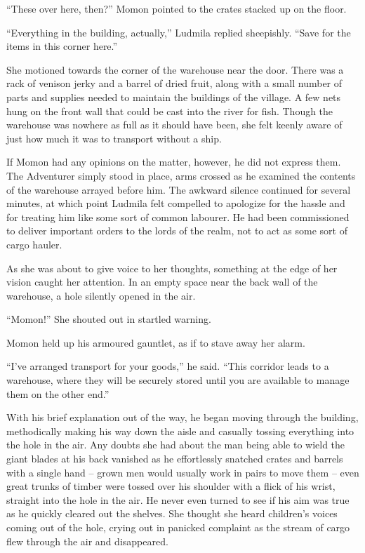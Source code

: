  

“These over here, then?” Momon pointed to the crates stacked up on the floor.

 

“Everything in the building, actually,” Ludmila replied sheepishly. “Save for the items in this corner here.”

 

She motioned towards the corner of the warehouse near the door. There was a rack of venison jerky and a barrel of dried fruit, along with a small number of parts and supplies needed to maintain the buildings of the village. A few nets hung on the front wall that could be cast into the river for fish. Though the warehouse was nowhere as full as it should have been, she felt keenly aware of just how much it was to transport without a ship.

 

If Momon had any opinions on the matter, however, he did not express them. The Adventurer simply stood in place, arms crossed as he examined the contents of the warehouse arrayed before him. The awkward silence continued for several minutes, at which point Ludmila felt compelled to apologize for the hassle and for treating him like some sort of common labourer. He had been commissioned to deliver important orders to the lords of the realm, not to act as some sort of cargo hauler.

 

As she was about to give voice to her thoughts, something at the edge of her vision caught her attention. In an empty space near the back wall of the warehouse, a hole silently opened in the air.

 

“Momon!” She shouted out in startled warning.

 

Momon held up his armoured gauntlet, as if to stave away her alarm.

 

“I’ve arranged transport for your goods,” he said. “This corridor leads to a warehouse, where they will be securely stored until you are available to manage them on the other end.”

 

With his brief explanation out of the way, he began moving through the building, methodically making his way down the aisle and casually tossing everything into the hole in the air. Any doubts she had about the man being able to wield the giant blades at his back vanished as he effortlessly snatched crates and barrels with a single hand – grown men would usually work in pairs to move them – even great trunks of timber were tossed over his shoulder with a flick of his wrist, straight into the hole in the air. He never even turned to see if his aim was true as he quickly cleared out the shelves. She thought she heard children’s voices coming out of the hole, crying out in panicked complaint as the stream of cargo flew through the air and disappeared.

